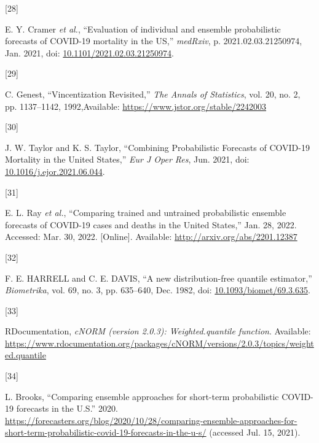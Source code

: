 \documentclass[
]{article}
\newlength{\cslhangindent}
\newlength{\csllabelwidth}
\newlength{\cslentryspacingunit} %
\newenvironment{CSLReferences}[2] %
 {%
  \setlength{\parindent}{0pt}
  \ifodd #1
  \let\oldpar\par
  \def\par{\hangindent=\cslhangindent\oldpar}
  \fi
  \setlength{\parskip}{#2\cslentryspacingunit}
 }%
 {}
\newcommand{\CSLLeftMargin}[1]{\parbox[t]{\csllabelwidth}{#1}}
\newcommand{\CSLRightInline}[1]{\parbox[t]{\linewidth - \csllabelwidth}{#1}\break}
\begin{document}
\begin{CSLReferences}{0}{0}
\leavevmode{}%
\CSLLeftMargin{{[}28{]} }
\CSLRightInline{E. Y. Cramer \emph{et al.}, {``Evaluation of individual
and ensemble probabilistic forecasts of {COVID-19} mortality in the
{US},''} \emph{medRxiv}, p. 2021.02.03.21250974, Jan. 2021, doi:
\href{https://doi.org/10.1101/2021.02.03.21250974}{10.1101/2021.02.03.21250974}.}

\leavevmode{}%
\CSLLeftMargin{{[}29{]} }
\CSLRightInline{C. Genest, {``Vincentization {Revisited},''} \emph{The
Annals of Statistics}, vol. 20, no. 2, pp. 1137--1142, 1992,Available:
\url{https://www.jstor.org/stable/2242003}}

\leavevmode{}%
\CSLLeftMargin{{[}30{]} }
\CSLRightInline{J. W. Taylor and K. S. Taylor, {``Combining
{Probabilistic Forecasts} of {COVID-19 Mortality} in the {United
States},''} \emph{Eur J Oper Res}, Jun. 2021, doi:
\href{https://doi.org/10.1016/j.ejor.2021.06.044}{10.1016/j.ejor.2021.06.044}.}

\leavevmode{}%
\CSLLeftMargin{{[}31{]} }
\CSLRightInline{E. L. Ray \emph{et al.}, {``Comparing trained and
untrained probabilistic ensemble forecasts of {COVID-19} cases and
deaths in the {United States},''} Jan. 28, 2022. Accessed: Mar. 30,
2022. {[}Online{]}. Available: \url{http://arxiv.org/abs/2201.12387}}

\leavevmode{}%
\CSLLeftMargin{{[}32{]} }
\CSLRightInline{F. E. HARRELL and C. E. DAVIS, {``A new
distribution-free quantile estimator,''} \emph{Biometrika}, vol. 69, no.
3, pp. 635--640, Dec. 1982, doi:
\href{https://doi.org/10.1093/biomet/69.3.635}{10.1093/biomet/69.3.635}.}

\leavevmode{}%
\CSLLeftMargin{{[}33{]} }
\CSLRightInline{RDocumentation, \emph{{cNORM} (version 2.0.3):
Weighted.quantile function}. Available:
\url{https://www.rdocumentation.org/packages/cNORM/versions/2.0.3/topics/weighted.quantile}}

\leavevmode{}%
\CSLLeftMargin{{[}34{]} }
\CSLRightInline{L. Brooks, {``Comparing ensemble approaches for
short-term probabilistic {COVID-19} forecasts in the {U}.{S}.''} 2020.
\url{https://forecasters.org/blog/2020/10/28/comparing-ensemble-approaches-for-short-term-probabilistic-covid-19-forecasts-in-the-u-s/}
(accessed Jul. 15, 2021).}


\end{CSLReferences}
\end{document}

